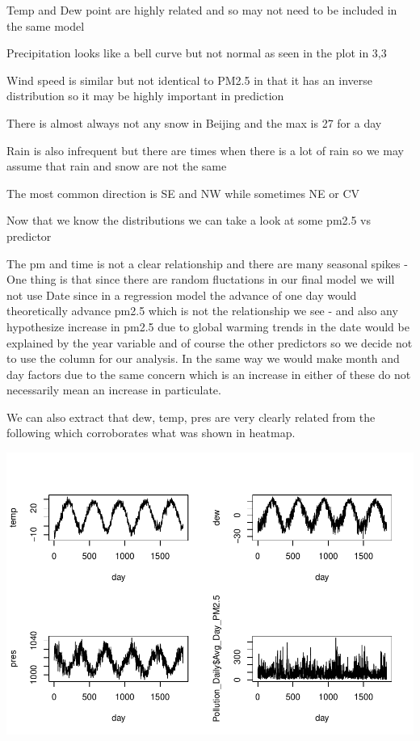 \documentclass[
]{article}
\begin{document}
Temp and Dew point are highly related and so may not need to be included
in the same model

Precipitation looks like a bell curve but not normal as seen in the plot
in 3,3

Wind speed is similar but not identical to PM2.5 in that it has an
inverse distribution so it may be highly important in prediction

There is almost always not any snow in Beijing and the max is 27 for a
day

Rain is also infrequent but there are times when there is a lot of rain
so we may assume that rain and snow are not the same

The most common direction is SE and NW while sometimes NE or CV

Now that we know the distributions we can take a look at some pm2.5 vs
predictor

The pm and time is not a clear relationship and there are many seasonal
spikes - One thing is that since there are random fluctations in our
final model we will not use Date since in a regression model the advance
of one day would theoretically advance pm2.5 which is not the
relationship we see - and also any hypothesize increase in pm2.5 due to
global warming trends in the date would be explained by the year
variable and of course the other predictors so we decide not to use the
column for our analysis. In the same way we would make month and day
factors due to the same concern which is an increase in either of these
do not necessarily mean an increase in particulate.

We can also extract that dew, temp, pres are very clearly related from
the following which corroborates what was shown in heatmap.

\includegraphics[height=0.9\textheight]{Final_Project_2_files/figure-latex/unnamed-chunk-5-1}
\end{document}
